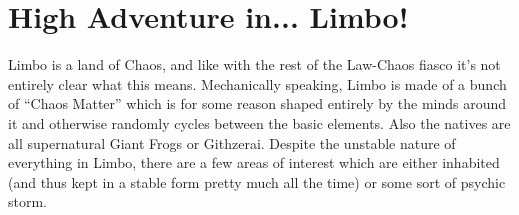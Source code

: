 %

\section{High Adventure in... Limbo!}

Limbo is a land of Chaos, and like with the rest of the Law-Chaos fiasco it's not entirely clear what this means. Mechanically speaking, Limbo is made of a bunch of ``Chaos Matter'' which is for some reason shaped entirely by the minds around it and otherwise randomly cycles between the basic elements. Also the natives are all supernatural Giant Frogs or Githzerai. Despite the unstable nature of everything in Limbo, there are a few areas of interest which are either inhabited (and thus kept in a stable form pretty much all the time) or some sort of psychic storm.

%